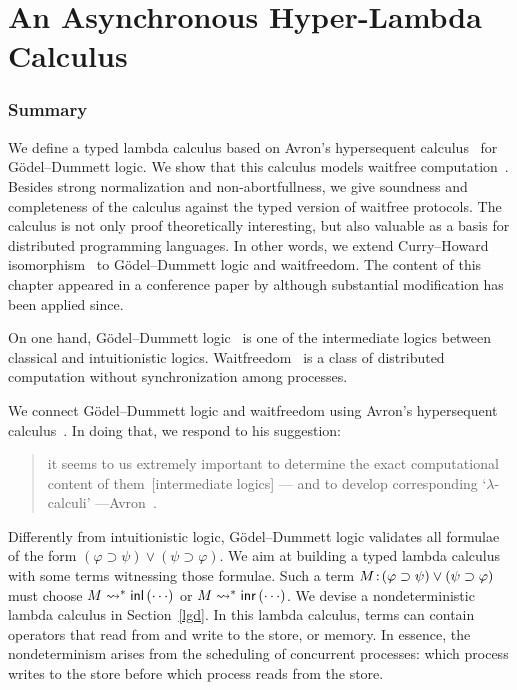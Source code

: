 \renewcommand{\comodL}{\comod cd}
\renewcommand{\comodR}{\comod dc}

\chapter{An Asynchronous Hyper-Lambda Calculus}
\label{ch:lambda}

\subsection{Summary}

We define a typed lambda calculus based on Avron's hypersequent
calculus~\citep{avron91} for G\"odel--Dummett logic.
We show that this calculus models
waitfree computation~\citep{Herlihy88,Saks:1993vq}.
Besides strong normalization and non-abortfullness,
we give soundness and completeness of
the calculus against the typed version of waitfree protocols.
The calculus is not only proof theoretically interesting,
but also valuable as a basis for distributed programming languages.
In other words, we extend
Curry--Howard isomorphism~\cite{curryhoward} to G\"odel--Dummett logic and
waitfreedom.
The content of this chapter appeared in a conference paper by
\citet{hiraiflops2012} although substantial modification has been
applied since.

On one hand, G\"odel--Dummett logic~\cite{dummett59}
is one of the intermediate logics
between classical and intuitionistic logics.
Waitfreedom~\cite{Herlihy88,Saks:1993vq} is a class of distributed
computation without synchronization among processes.

We connect G\"odel--Dummett logic and waitfreedom using
Avron's hypersequent calculus~\cite{avron91}.
In doing that, we respond to his suggestion:
\begin{quote}
it seems to us extremely important to determine the exact
       computational content of them~[intermediate logics] ---
       and {to develop corresponding `$\lambda$-calculi'}
       ---Avron~\cite{avron91}.
\end{quote}
Differently from intuitionistic logic, G\"odel--Dummett logic validates
all formulae of the form
 $(\varphi\supset\psi)\vee(\psi\supset\varphi)$.
We aim at building a typed lambda calculus
with some terms witnessing those formulae.
Such a term
${M} \mathord{\colon\kern -2pt}{(\varphi\supset\psi)\vee(\psi\supset\varphi)}$ must choose
$M\rightsquigarrow^\ast \mathsf{inl}\left({\cdots}\right)$ or $M\rightsquigarrow^\ast \mathsf{inr}\left({\cdots}\right)$.
We devise a nondeterministic lambda calculus in Section~\ref{lgd}.
In this lambda calculus, terms can contain operators that read from and
write to the store, or memory.
In essence, the nondeterminism arises from the scheduling of concurrent
processes: which process writes to the store before which process
reads from the store.

